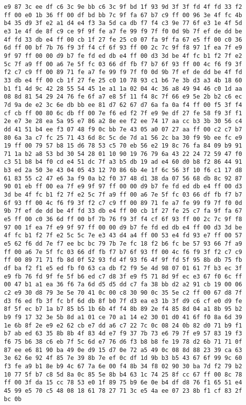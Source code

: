 \documentclass{article}
\begin{document}
\begin{verbatim}
e9 87 3c ee df c6 3c 9e bb c6 3c 9f bd 1f 93 9d 3f 3f fd 4f fd 33 f2 ff 00 e0 1b 36 ff 00 df bd bb 7c 9f fa 67 b7 c9 ff 00 96 3e 4f fc 4b b4 35 d9 3f e2 a1 d4 e4 f3 3a 5d ca db f7 f4 c3 9e 77 6f e3 1e 4f 5d e3 1e 4f de 8f c9 ce 9f 9f fe a7 fe 99 f9 7f f0 0d 9b 7f ef de dd be 4f fd 33 db e4 ff 00 cb 1f 27 fe 25 c0 07 fa 9f fa 67 e5 ff 00 c0 36 6d ff 00 bf 7b 76 f9 3f f4 cf 6f 93 ff 00 2c 7c 9f f8 97 1f ea 7f e9 9f 97 ff 00 00 d9 b7 fe fd ed db e4 ff 00 d3 3d be 4f fc b1 f2 7f e2 5c 7f a9 ff 00 a6 7e 5f fc 03 66 df fb f7 b7 6f 93 ff 00 4c f6 f9 3f f2 c7 c9 ff 00 89 71 fe a7 fe 99 f9 7f f0 0d 9b 7f ef de dd be 4f fd 33 db e4 ff 00 cb 1f 27 fe 25 c0 10 78 93 c1 b6 7e 3b d3 a3 4b 18 60 b1 f1 4d 9c 42 28 55 54 45 1e a1 1a 02 04 4c 36 a8 49 94 46 c0 1d aa 08 8d 81 54 29 24 76 fe 6f a7 e8 5f 11 f4 8c 7f 66 e9 5e 2b b2 c6 ec 7d 9a de e2 3c 6e db bb ee 81 d7 62 67 d7 6a fa 0a f4 ff 00 f5 3f f4 cf cb ff 00 80 6c db ff 00 7e f6 ed f2 7f e9 9e df 27 fe 58 f9 3f f1 2e e7 3e 28 ea 5a 95 e7 86 a2 8e ee f2 ee 74 17 aa cc b3 3b 30 56 c4 dd 41 51 b4 ee f3 07 48 f9 0c bb 7e 43 05 a0 07 27 aa ff 00 c2 c7 b7 80 6a 3a c7 fc 25 71 43 6d 8c 5c de 7d a1 56 2c ba 30 f9 9b ee fc e9 19 ff 00 79 57 b8 15 d6 78 53 c5 70 eb 56 e2 19 8c 76 fa 84 09 b9 91 71 1a b2 a8 53 bd 30 54 28 01 10 90 19 76 79 6a 43 22 24 72 59 47 f0 c3 51 b8 b4 f0 cd e4 51 dc 7f a3 b5 db 19 ad e4 60 d0 b8 f2 86 44 91 b3 ed 2a 50 3e 43 04 05 43 12 70 86 6b 4e 1f 6c 56 3f 10 f6 c1 17 d8 61 83 55 c2 47 e6 3a f9 0a b2 f0 37 48 d1 38 da 07 56 68 db 8c 92 87 90 01 eb ff 00 ea 7f e9 9f 97 ff 00 00 d9 b7 fe fd ed db e4 ff 00 d3 3d be 4f fc b1 f2 7f e2 5c 7f a9 ff 00 a6 7e 5f fc 03 66 df fb f7 b7 6f 93 ff 00 4c f6 f9 3f f2 c7 c9 ff 00 89 71 fe a7 fe 99 f9 7f f0 0d 9b 7f ef de dd be 4f fd 33 db e4 ff 00 cb 1f 27 fe 25 c7 fa 9f fa 67 e5 ff 00 c0 36 6d ff 00 bf 7b 76 f9 3f f4 cf 6f 93 ff 00 2c 7c 9f f8 97 00 1f ea 7f e9 9f 97 ff 00 00 d9 b7 fe fd ed db e4 ff 00 d3 3d be 4f fc b1 f2 7f e2 5c 5c 7e e3 43 d4 a4 ff 00 53 e4 fd 93 e7 ff 00 57 e5 62 f6 dd 7e f7 ee bc bc 79 7b 7e fc 18 f2 b6 fc be 57 93 66 7f a9 ff 00 a6 7e 5f fc 03 66 df fb f7 b7 6f 93 ff 00 4c f6 f9 3f f2 c7 c9 ff 00 89 71 71 fb 8d 0f 52 93 fd 4f 93 f6 4f 9f fd 5f 95 8b db 75 fb df ba f2 f1 e5 ed fb f0 63 ca db f2 f9 5e 4d 98 07 01 61 7f b3 ec 3f e9 fb 76 fd 9f fe 5f b6 ed c7 d8 3f e9 f5 71 8d 9f ec e3 67 f0 6c ff 00 47 b1 a1 ea 36 f6 7a 6d d5 d5 dd c7 fa 38 bb d2 a2 91 cb 19 00 06 c2 e9 30 d8 79 3e 5e 70 41 0c 00 c8 30 90 0c 35 5e c2 ff 00 67 d8 7f d3 f6 ed fb 3f fc bf 6d db 8f b0 7f d3 ea e3 1b 3f d9 c6 cf e0 d9 fe 8f 5f ec b7 1a b7 85 b5 1b 6b 4f f4 8b 89 2e f4 85 8d 04 a1 8b 95 b2 b9 f9 17 32 3e 5b 8d a1 01 ce 70 a1 14 e2 30 01 d0 41 6f f0 8a 6d 39 1e 6b 8f 2e e9 e2 62 cb e7 dd a6 c7 22 7c 0c 08 24 0b 82 d0 71 b9 f1 b7 ab ed 63 35 8b 8b 4f 83 4d e7 f9 37 7b 73 e6 79 7f e9 57 83 19 f3 f6 75 b6 38 c6 eb 7f 5c 6d e7 76 d6 f3 b8 b8 fe 19 78 d2 6b 71 71 0f 87 ee e6 81 90 ba 49 0e d9 15 d7 0e 72 a5 49 0c 08 8d 88 23 39 ca 63 3e 62 6e 92 4f 85 7e 39 8b 7e ef 0c df 1d 9b b3 b5 43 67 6f 99 9c 60 f3 fe a9 b1 8e b9 4c 67 7a 6e 00 f4 8b 34 f8 02 90 30 ba 7d f2 79 b2 10 77 5f b7 c8 5d 8a 0c 85 5e 8b b4 63 1c 74 25 8f cc 67 ff 00 8c 78 ff 00 3f da 15 cc 78 53 e0 1f 89 75 b9 6e 0e b4 df d8 76 f1 65 51 e4 45 99 e5 70 c5 48 08 18 61 78 27 71 3c e5 4a ee 07 23 8b f1 cf 83 2f bc 0b 
\end{verbatim}
\end{document}
